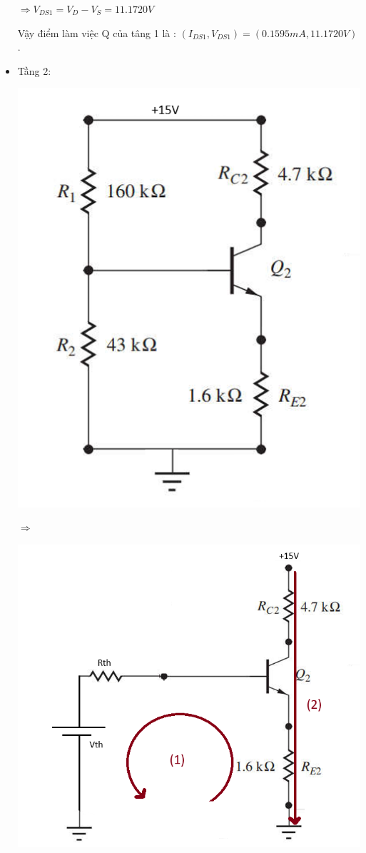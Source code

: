 \begin{itemize}[label=-]
		$ \Rightarrow V_{DS1} = V_{D} - V_{S} = 11.1720V $
		
		Vậy điểm làm việc Q của tâng 1 là : $(I_{DS1}, V_{DS1}) = (0.1595mA, 11.1720V)$.
		
		\item Tầng 2:
		
		\begin{minipage}{0.4\linewidth}
			\includegraphics[width=.7\linewidth]{./my-chapters/my-images/Question6/DC_tang2.png}
		\end{minipage}
		\begin{minipage}{0.1\linewidth}
			$\Rightarrow$
		\end{minipage}
		\begin{minipage}{0.4\linewidth}
			\includegraphics[width=.8\linewidth]{./my-chapters/my-images/Question6/DC_tang2 - Copy.png}
		\end{minipage}
		

\end{itemize}
